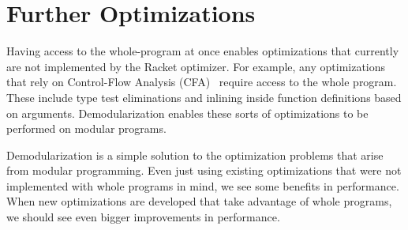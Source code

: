 \section{Further Optimizations}

Having access to the whole-program at once enables optimizations that currently are not implemented by the Racket optimizer.
For example, any optimizations that rely on Control-Flow Analysis (CFA)~\cite{cfa} require access to the whole program.
These include type test eliminations and inlining inside function definitions based on arguments.
Demodularization enables these sorts of optimizations to be performed on modular programs.

Demodularization is a simple solution to the optimization problems that arise from modular programming. 
Even just using existing optimizations that were not implemented with whole programs in mind, we see some benefits in performance. 
When new optimizations are developed that take advantage of whole programs, we should see even bigger improvements in performance.
